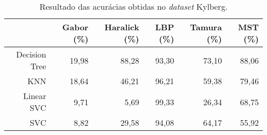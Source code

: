 \begin{table}[H]
    \centering
    \caption[Resultado das acurácias obtidas no \textit{dataset} Kylberg]{Resultado das acurácias obtidas no \textit{dataset} Kylberg.
    \label{tab:kylbergAcuracias}}
    \begin{tabular}{rrrrrr}
        \toprule
            & Gabor (\%) & Haralick (\%) & LBP (\%) & Tamura (\%) & MST (\%) \\
        \midrule
            Decision Tree & 19,98 & 88,28 & 93,30 & 73,10 & 88,06 \\
            KNN & 18,64 & 46,21 & 96,21 & 59,38 & 79,46 \\
            Linear SVC & 9,71 & 5,69 & 99,33 & 26,34 & 68,75 \\
            SVC & 8,82 & 29,58 & 94,08 & 64,17 & 55,92 \\
        \bottomrule
    \end{tabular}
\end{table}
